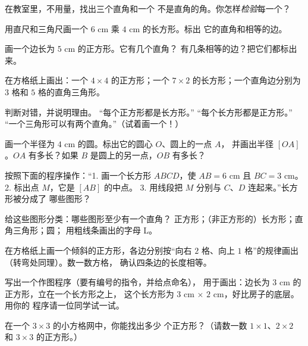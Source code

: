 \begin{exercise}[$\star$]\label{exo:g3:shapes:1}
在教室里，不用量，找出三个直角和一个
不是直角的角。你怎样\emph{检验}每一个？
\end{exercise}

\begin{exercise}[$\star$]\label{exo:g3:shapes:2}
用直尺和三角尺画一个 $6$ cm 乘 $4$ cm 的长方形。标出
它的直角和相等的边。
\end{exercise}

\begin{exercise}[$\star$]\label{exo:g3:shapes:3}
画一个边长为 $5$ cm 的正方形。它有几个直角？
有几条相等的边？把它们都标出来。
\end{exercise}

\begin{exercise}[$\star$]\label{exo:g3:shapes:4}
在方格纸上画出：一个 $4 \times 4$ 的正方形；一个 $7 \times 2$
的长方形；一个直角边分别为 $3$ 格和 $5$ 格的直角三角形。
\end{exercise}

\begin{exercise}[$\star$]\label{exo:g3:shapes:5}
判断对错，并说明理由。
“每个正方形都是长方形。”\quad
“每个长方形都是正方形。”\quad
“一个三角形可以有两个直角。”（试着画一个！）
\end{exercise}

\begin{exercise}[$\star$]\label{exo:g3:shapes:6}
画一个半径为 $4$ cm 的圆。标出它的圆心 $O$、圆上的一点 $A$，
并画出半径 $[OA]$。$OA$ 有多长？如果 $B$
是圆上的另一点，$OB$ 有多长？
\end{exercise}

\begin{exercise}[$\star$]\label{exo:g3:shapes:7}
按照下面的程序操作：“1. 画一个长方形 $ABCD$，使 $AB = 6$ cm
且 $BC = 3$ cm。2. 标出点 $M$，它是 $[AB]$ 的中点。
3. 用线段把 $M$ 分别与 $C$、$D$ 连起来。”长方形被分成了
哪些图形？
\end{exercise}

\begin{exercise}[$\star$]\label{exo:g3:shapes:8}
给这些图形分类：哪些图形至少有一个直角？
正方形；（非正方形的）长方形；直角三角形；圆；
用粗线条画出的字母 L。
\end{exercise}

\begin{exercise}[$\star\star$]\label{exo:g3:shapes:9}
在方格纸上画一个倾斜的正方形，各边分别按“向右 $2$ 格、向上 $1$
格”的规律画出（转弯处同理）。数一数方格，
确认四条边的长度相等。
\end{exercise}

\begin{exercise}[$\star\star$]\label{exo:g3:shapes:10}
写出一个作图程序（要有编号的指令，并给点命名），
用于画出：边长为 $3$ cm 的正方形，立在一个长方形之上，
这个长方形为 $3$ cm $\times$ $2$ cm，好比房子的底层。用你的
程序请一位同学试一试。
\end{exercise}

\begin{exercise}[$\star\star$]\label{exo:g3:shapes:11}
在一个 $3 \times 3$ 的小方格网中，你能找出多少
个正方形？（请数一数 $1 \times 1$、$2 \times 2$ 和
$3 \times 3$ 的正方形。）
\end{exercise}
